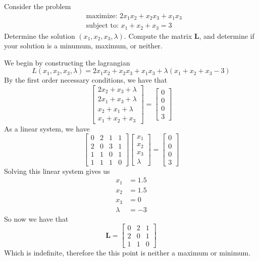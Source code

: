 \documentclass{homework}
\begin{document}
\begin{problem}[18-7]
 Consider the problem
 \[
   \begin{aligned}
     &\text{maximize: } 2x_1x_2 + x_2x_3 + x_1x_3 \\
     &\text{subject to: } x_1 + x_2 + x_3 = 3
   \end{aligned}
 \]
 Determine the solution $(x_1, x_2, x_3, \lambda)$. Compute the matrix $\mathbf{L}$, and determine if your solution is a minumum, maximum, or neither.
\end{problem}

\begin{solution}
 We begin by constructing the lagrangian
 \[ L(x_1, x_2, x_3, \lambda) = 2x_1x_2 + x_2x_3 + x_1x_3 + \lambda(x_1 + x_2 + x_3 - 3)\]
 By the first order necessary conditions, we have that
 \[
   \begin{bmatrix}
     2x_2 + x_3 + \lambda \\
     2x_1 + x_3 + \lambda \\
     x_2 + x_1 + \lambda \\
     x_1 + x_2 + x_3
   \end{bmatrix}
   = 
   \begin{bmatrix}
     0 \\
     0 \\
     0 \\
     3
   \end{bmatrix}
 \]
 As a linear system, we have
 \[
   \begin{bmatrix}
     0 & 2 & 1 & 1 \\
     2 & 0 & 3 & 1 \\
     1 & 1 & 0 & 1 \\
     1 & 1 & 1 & 0
   \end{bmatrix}
   \begin{bmatrix}
     x_1 \\
     x_2 \\
     x_3 \\
     \lambda
   \end{bmatrix}
   =
   \begin{bmatrix}
     0 \\
     0 \\
     0 \\
     3
   \end{bmatrix}
 \]
 Solving this linear system gives us
 \[
   \begin{aligned}
     x_1 &= 1.5 \\
     x_2 &=  1.5 \\
     x_3 &= 0 \\
     \lambda &= -3
   \end{aligned}
 \]
 So now we have that 
 \[
   \mathbf{L}
   =
   \begin{bmatrix}
     0 & 2 & 1\\
     2 & 0 & 1\\
     1 & 1 & 0
   \end{bmatrix}
 \]
 Which is indefinite, therefore the this point is neither a maximum or minimum.
\end{solution}
\end{document}
